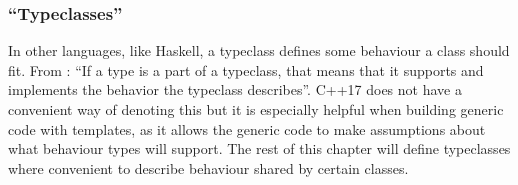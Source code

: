 \subsubsection{``Typeclasses''}
In other languages, like Haskell, a typeclass defines some behaviour a class should fit. From : ``If a type is a part of a typeclass, that means that it supports and implements the behavior the typeclass describes''.
C++17 does not have a convenient way of denoting this but it is especially helpful when building generic code with templates, as it allows the generic code to make assumptions about what behaviour types will support.
The rest of this chapter will define typeclasses where convenient to describe behaviour shared by certain classes.






